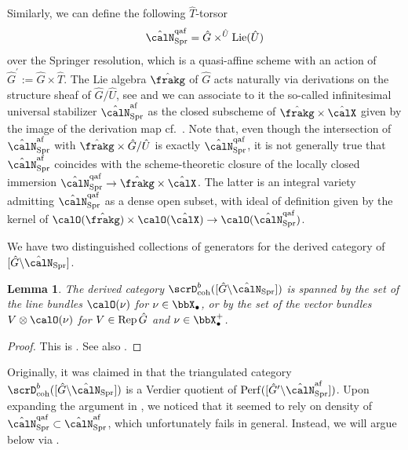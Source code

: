 \documentclass[10pt, reqno]{amsart}
\theoremstyle{plain}
\newtheorem{lemma}[theorem]{Lemma}
\theoremstyle{definition}
\numberwithin{equation}{section}
\begin{document}
Similarly, we can define the following $\hat{T}$-torsor
\begin{equation}
	\hat{\calN}_{\mathrm{Spr}}^{\mathrm{qaf}}=\hat{G}\times^{\hat{U}}\mathrm{Lie}(\hat{U})%
\end{equation}
over the Springer resolution, which is a quasi-affine scheme with an action of $\hat{G}^\prime:=\hat{G}\times\hat{T}$. %
The Lie algebra $\hat{\frakg}$ of $\hat{G}$ acts naturally via derivations on the structure sheaf of $\hat{G}/\hat{U}$, see \cite[Equation (6.2.9)]{AR} and we can associate to it the so-called infinitesimal universal stabilizer $\hat{\calN}_{\mathrm{Spr}}^{\mathrm{af}} $ as the closed subscheme of $\hat{\frakg} \times \hat{\calX}$ given by the image of the derivation map cf.\ \cite[Section 6.2.2]{AR}. Note that, even though the intersection of $\hat{\calN}_{\mathrm{Spr}}^{\mathrm{af}}$ with $ \hat{\frakg} \times \hat{G}/\hat{U}$ is exactly $\hat{\calN}^{\mathrm{qaf}}_{\mathrm{Spr}}$, it is not generally true that $\hat{\calN}_{\mathrm{Spr}}^{\mathrm{af}}$ coincides with the scheme-theoretic closure of the locally closed immersion $ \hat{\calN}^{\mathrm{qaf}}_{\mathrm{Spr}} \to \hat{\frakg} \times \hat{\calX}$. 
The latter is an integral variety admitting $\hat{\calN}_{\mathrm{Spr}}^{\mathrm{qaf}}$ as a dense open subset, 
with ideal of definition given by the kernel of $\calO(\hat{\frakg})\times \calO(\hat{\calX}) \to \calO(\hat{\calN}^{\mathrm{qaf}}_{\mathrm{Spr}})$.

We have two distinguished collections of generators for the derived category of $[\hat{G}\backslash \hat{\calN}_{\mathrm{Spr}}]$.

\begin{lemma}
	The derived category $\scrD^b_{\rm{coh}}([\hat{G}\backslash \hat{\calN}_{\mathrm{Spr}}])$ is spanned by the set of the line bundles $\calO(\nu)$ for $\nu \in \bbX_\bullet$, or by the set of the vector bundles $V\otimes \calO(\nu)$ for $V\in {\rm{Rep}}\,\hat{G}$ and $\nu \in \bbX_\bullet^+$.   
\end{lemma}

\begin{proof}
	This is \cite[Lemma 21]{AB09}. See also \cite[Lemma 6.2.8]{AR}.
\end{proof}

Originally, it was claimed in \cite[Lemma 20]{AB09} that the triangulated category $\scrD^b_{\rm{coh}}([\hat{G}\backslash \hat{\calN}_{\mathrm{Spr}}])$ is a Verdier quotient of ${\mathrm{Perf}}([\hat{G}'\backslash \hat{\calN}_{\mathrm{Spr}}^{\mathrm{af}}])$. Upon expanding the argument in \cite[Proposition 6.2.8]{AR}, we noticed that it seemed to rely on density of $\hat{\calN}_{\mathrm{Spr}}^{\mathrm{qaf}} \subset \hat{\calN}_{\mathrm{Spr}}^{\mathrm{af}} $, which unfortunately fails in general. Instead, we will argue below via \cite[Remark 6.3.10]{AR}.
\end{document}
